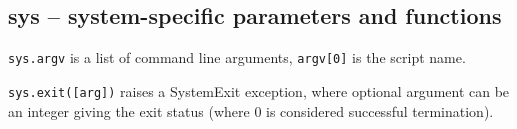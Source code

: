 %

\subsection{sys -- system-specific parameters and functions}

\texttt{sys.argv} is a list of command line arguments, \texttt{argv[0]} is the script name.

\texttt{sys.exit([arg])} raises a SystemExit exception, where optional argument can be an integer giving the exit status (where 0 is considered successful termination).

%
